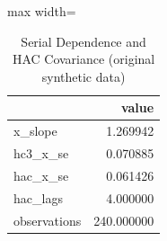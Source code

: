 \begin{table}[htbp]
\centering
\caption{Serial Dependence and HAC Covariance (original synthetic data)}
\begingroup
\small
\setlength{\tabcolsep}{6pt}
\renewcommand{\arraystretch}{1.12}
\begin{adjustbox}{max width=\linewidth}
\begin{tabular}{@{}lr@{}}
\toprule
 & value \\
\midrule
x\_slope & 1.269942 \\
hc3\_x\_se & 0.070885 \\
hac\_x\_se & 0.061426 \\
hac\_lags & 4.000000 \\
observations & 240.000000 \\
\bottomrule
\end{tabular}
\end{adjustbox}
\endgroup
\end{table}